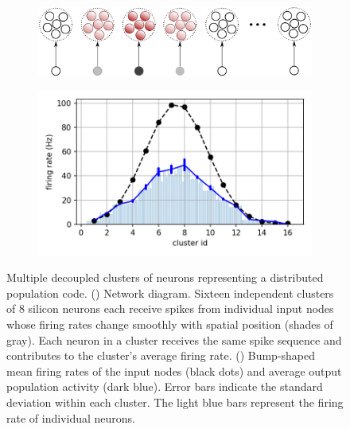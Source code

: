 \begin{figure}[h!]
\centering
\begin{subfigure}{0.45\textwidth}
\centering
\includegraphics[width=0.85\linewidth]{img/chapter4/decoupled_sketch.png}
\caption{}
\label{fig:decoupled_sketch}
\end{subfigure}
\begin{subfigure}{.5\textwidth}
\centering
\includegraphics[width=\textwidth]{img/chapter4/clustered_inh_WTA_bump_sharpening_base.png}
\caption{}
\label{fig:bump_decoupled}
\end{subfigure}
\caption[Population code with decoupled clusters]{Multiple decoupled clusters of neurons representing a distributed population code.
() Network diagram.
Sixteen independent clusters of 8 silicon neurons each receive spikes from individual input nodes whose firing rates change smoothly with spatial position (shades of gray). Each neuron in a cluster receives the same spike sequence and contributes to the cluster's average firing rate.
() Bump-shaped mean firing rates of the input nodes (black dots) and average output population activity (dark blue).
Error bars indicate the standard deviation within each cluster. The light blue bars represent the firing rate of individual neurons.}
\label{fig:population_coding_decoupled}
\end{figure}

